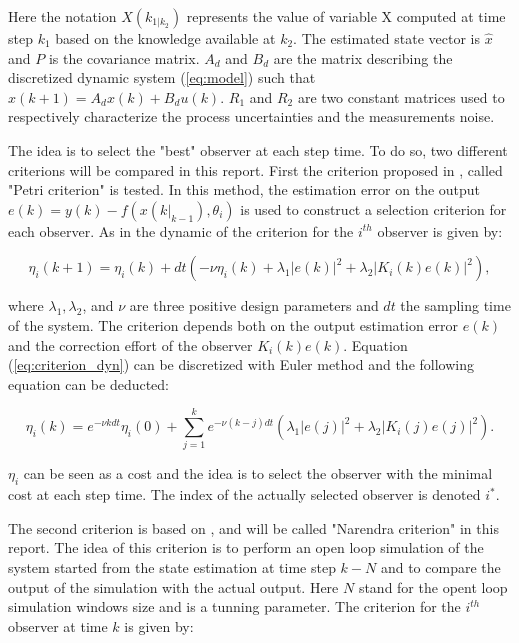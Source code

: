 Here the notation $X(k_{1|k_2})$ represents the value of variable X computed at time step $k_1$ based on the knowledge available at $k_2$. The estimated state vector is $\hat{x}$ and $P$ is the covariance matrix. $A_d$ and $B_d$ are the matrix describing the discretized dynamic system (\ref{eq:model}) such that $x(k+1) = A_dx(k) + B_d u(k)$. $R_1$ and $R_2$ are two constant matrices used to respectively characterize the process uncertainties and the measurements noise.
\medskip


The idea is to select the "best" observer at each step time. To do so, two different criterions will be compared in this report. First the criterion proposed in \cite{petriImprovingEstimationPerformance2022}, called "Petri criterion" is tested. In this method, the estimation error on the output $e(k) = y(k) - f(x(k|_{k-1}), \theta_i)$ is used to construct a selection criterion for each observer. As in \cite{petriImprovingEstimationPerformance2022} the dynamic of the criterion for the $i^{th}$ observer is given by:

\begin{equation}
\eta_i (k+1) = \eta_i (k) + dt \left(- \nu \eta_i(k) + \lambda_1 |e(k)|^2 + \lambda_2 |K_i(k) e(k)|^2 \right),
\label{eq:criterion_dyn}
\end{equation}

where $\lambda_1, \lambda_2$, and $\nu$ are three positive design parameters and $dt$ the sampling time of the system. The criterion depends both on the output estimation error $e(k)$ and the correction effort of the observer $K_i(k) e(k)$. Equation (\ref{eq:criterion_dyn}) can be discretized with Euler method and the following equation can be deducted:

\begin{equation}
\eta_i(k) = e^{-\nu k dt} \eta_i(0) + \sum_{j=1}^{k} e^{-\nu(k-j)dt} (\lambda_1 |e(j)|^2 + \lambda_2 |K_i(j) e(j)|^2 ).
\end{equation} 

$\eta_i$ can be seen as a cost and the idea is to select the observer with the minimal cost at each step time. The index of the actually selected observer is denoted $i^*$.

\medskip


The second criterion is based on \cite{narendraAdaptiveControlUsing1997}, and will be called "Narendra criterion" in this report. The idea of this criterion is to perform an open loop simulation of the system started from the state estimation at time step $k - N$ and to compare the output of the simulation with the actual output. Here $N$ stand for the opent loop simulation windows size and is a tunning parameter. The criterion for the $i^{th}$ observer at time $k$ is given by: 

